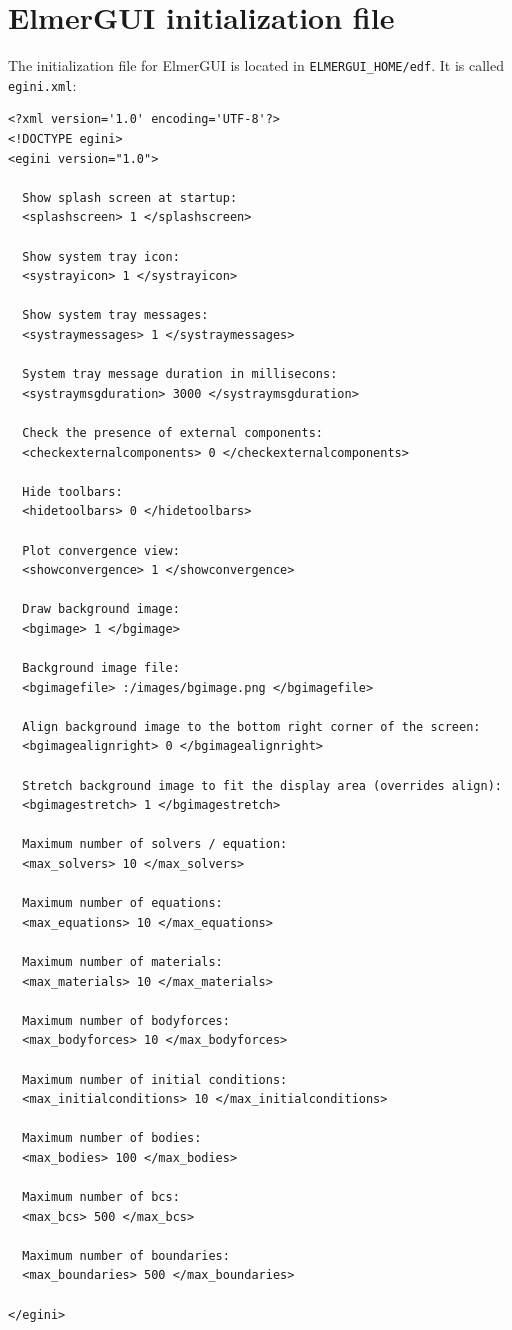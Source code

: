 
\chapter{ElmerGUI initialization file}

The initialization file for ElmerGUI is located in {\tt ELMERGUI\_HOME/edf}. It is called {\tt egini.xml}:

\begin{footnotesize}
\begin{verbatim}
<?xml version='1.0' encoding='UTF-8'?>
<!DOCTYPE egini>
<egini version="1.0">

  Show splash screen at startup:
  <splashscreen> 1 </splashscreen>

  Show system tray icon:
  <systrayicon> 1 </systrayicon>

  Show system tray messages:
  <systraymessages> 1 </systraymessages>

  System tray message duration in millisecons:
  <systraymsgduration> 3000 </systraymsgduration>

  Check the presence of external components:
  <checkexternalcomponents> 0 </checkexternalcomponents>

  Hide toolbars:
  <hidetoolbars> 0 </hidetoolbars>

  Plot convergence view:
  <showconvergence> 1 </showconvergence>

  Draw background image:
  <bgimage> 1 </bgimage>

  Background image file:
  <bgimagefile> :/images/bgimage.png </bgimagefile>

  Align background image to the bottom right corner of the screen:
  <bgimagealignright> 0 </bgimagealignright>

  Stretch background image to fit the display area (overrides align):
  <bgimagestretch> 1 </bgimagestretch>

  Maximum number of solvers / equation:
  <max_solvers> 10 </max_solvers>

  Maximum number of equations:
  <max_equations> 10 </max_equations>

  Maximum number of materials:
  <max_materials> 10 </max_materials>

  Maximum number of bodyforces:
  <max_bodyforces> 10 </max_bodyforces>

  Maximum number of initial conditions:
  <max_initialconditions> 10 </max_initialconditions>

  Maximum number of bodies:
  <max_bodies> 100 </max_bodies>

  Maximum number of bcs:
  <max_bcs> 500 </max_bcs>

  Maximum number of boundaries:
  <max_boundaries> 500 </max_boundaries>

</egini>
\end{verbatim}
\end{footnotesize}

